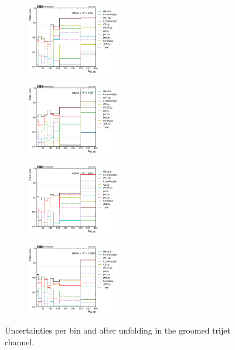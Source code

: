 \begin{figure}[ht!]
  \centering
  \begin{subfigure}
    \centering
    \includegraphics[width=0.45\textwidth]{figures/multijet/unfolding/trijet/unfolded_fracUnc_groomed_0.png}
\end{subfigure}
  \begin{subfigure}
    \centering
    \includegraphics[width=0.45\textwidth]{figures/multijet/unfolding/trijet/unfolded_fracUnc_groomed_1.png}
\end{subfigure}
  \begin{subfigure}
    \centering
    \includegraphics[width=0.45\textwidth]{figures/multijet/unfolding/trijet/unfolded_fracUnc_groomed_2.png}
\end{subfigure}
\begin{subfigure}
    \centering
    \includegraphics[width=0.45\textwidth]{figures/multijet/unfolding/trijet/unfolded_fracUnc_groomed_3.png}
\end{subfigure}
  \caption{Uncertainties per bin and after unfolding in the groomed trijet channel.}
  \label{fig:trijetunc_groomed_postunfold}
\end{figure}
